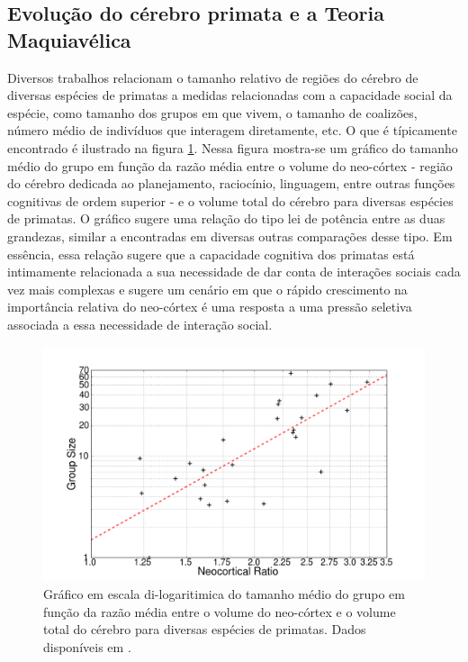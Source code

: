 \subsection{}

\subsection{Evolução do cérebro primata e a Teoria Maquiavélica}

Diversos trabalhos\cite{Dunbar2008,Dunbar2009, Dunbar2010,Aiello1993,Joffe1997} relacionam o tamanho relativo de regiões do cérebro de diversas espécies de primatas a medidas relacionadas com a capacidade social da espécie, como tamanho dos grupos em que vivem, o tamanho de coalizões, número médio de indivíduos que interagem diretamente, etc. O que é típicamente encontrado é ilustrado na figura \ref{fig:dunbarlaw}. Nessa figura mostra-se um gráfico do tamanho médio do grupo em função da razão média entre o volume do neo-córtex - região do cérebro dedicada ao planejamento, raciocínio, linguagem, entre outras funções cognitivas de ordem superior - e o volume total do cérebro para diversas espécies de primatas. O gráfico sugere uma relação do tipo lei de potência entre as duas grandezas, similar a encontradas em diversas outras comparações desse tipo. Em essência, essa relação sugere que a capacidade cognitiva dos primatas está intimamente relacionada a sua necessidade de dar conta de interações sociais cada 
vez mais complexas e sugere um cenário em que o rápido crescimento na importância relativa do neo-córtex é uma resposta a uma pressão seletiva associada a essa necessidade de interação social.  

\begin{figure}
	\centering
	\includegraphics[width = \textwidth]{figuras/dunbar.png}
 	\caption{\label{fig:dunbarlaw} Gráfico em escala di-logaritimica do tamanho médio do grupo em função da razão média entre o volume do neo-córtex e o volume total do cérebro para diversas espécies de primatas. Dados disponíveis em \citep{Dunbar2009}.}
\end{figure}

